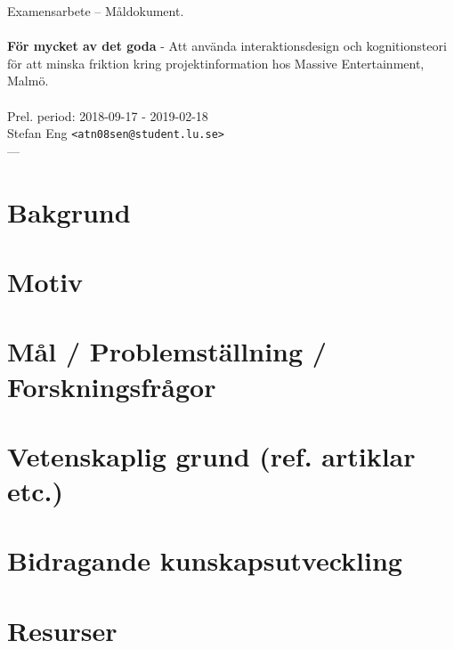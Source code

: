 \documentclass{article}
\begin{document}
\begin{center}

  Examensarbete -- Måldokument. \\
  \ \\
  {\large
    \textbf{För mycket av det goda} -
    Att använda interaktionsdesign och kognitionsteori för
    att minska friktion kring projektinformation hos Massive
    Entertainment, Malmö. \\
  }
  \ \\
  Prel. period: 2018-09-17 - 2019-02-18\\
  Stefan Eng \texttt{<atn08sen@student.lu.se>}
  \ \\
  ---
  \vspace{-0.3cm}

\end{center}

\section*{Bakgrund}

\section*{Motiv}

\section*{Mål / Problemställning / Forskningsfrågor}

\section*{Vetenskaplig grund (ref. artiklar etc.)}

\section*{Bidragande kunskapsutveckling}

\section*{Resurser}
\end{document}
